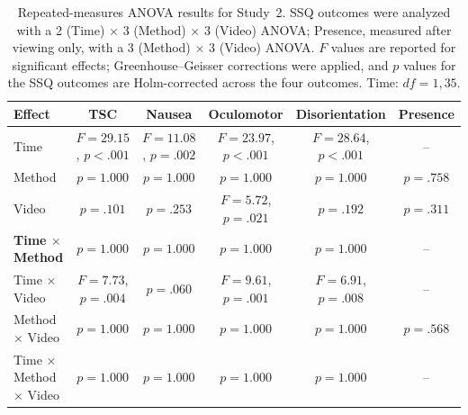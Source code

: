 \begin{table}[t]
  \caption{Repeated-measures ANOVA results for Study~2. SSQ outcomes were
  analyzed with a 2 (Time) $\times$ 3 (Method) $\times$ 3 (Video) ANOVA;
  Presence, measured after viewing only, with a 3 (Method) $\times$ 3 (Video)
  ANOVA. $F$ values are reported for significant effects;
  Greenhouse--Geisser corrections were applied, and $p$ values for the SSQ
  outcomes are Holm-corrected across the four outcomes. Time: $df = 1, 35$.}
  \label{tab:s2-anova}
  \centering
  \footnotesize
  \begin{tabular}{lccccc}
    \toprule
    \textbf{Effect} & \textbf{TSC} & \textbf{Nausea} & \textbf{Oculomotor} & \textbf{Disorientation} & \textbf{Presence} \\
    \midrule
    Time                          & $F = 29.15$, $p < .001$ & $F = 11.08$, $p = .002$ & $F = 23.97$, $p < .001$ & $F = 28.64$, $p < .001$ & -- \\
    Method                        & $p = 1.000$ & $p = 1.000$ & $p = 1.000$ & $p = 1.000$ & $p = .758$ \\
    Video                         & $p = .101$ & $p = .253$ & $F = 5.72$, $p = .021$ & $p = .192$ & $p = .311$ \\
    \textbf{Time $\times$ Method} & $p = 1.000$ & $p = 1.000$ & $p = 1.000$ & $p = 1.000$ & -- \\
    Time $\times$ Video           & $F = 7.73$, $p = .004$ & $p = .060$ & $F = 9.61$, $p = .001$ & $F = 6.91$, $p = .008$ & -- \\
    Method $\times$ Video         & $p = 1.000$ & $p = 1.000$ & $p = 1.000$ & $p = 1.000$ & $p = .568$ \\
    Time $\times$ Method $\times$ Video & $p = 1.000$ & $p = 1.000$ & $p = 1.000$ & $p = 1.000$ & -- \\
    \bottomrule
  \end{tabular}
\end{table}

